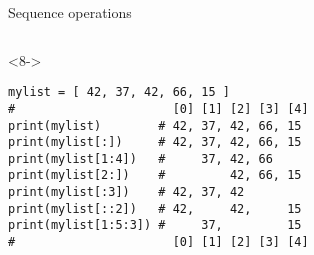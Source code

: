 \begin{frame}[fragile]{Sequence operations}
\begin{center}
\begin{columns}[onlytextwidth]
\begin{column}{\textwidth}
      \begin{onlyenv}<8->
        \begin{lstlisting}[style=python,morekeywords={for, in, range, list}]
mylist = [ 42, 37, 42, 66, 15 ]
#                      [0] [1] [2] [3] [4]
print(mylist)        # 42, 37, 42, 66, 15
print(mylist[:])     # 42, 37, 42, 66, 15
print(mylist[1:4])   #     37, 42, 66
print(mylist[2:])    #         42, 66, 15
print(mylist[:3])    # 42, 37, 42
print(mylist[::2])   # 42,     42,     15
print(mylist[1:5:3]) #     37,         15
#                      [0] [1] [2] [3] [4] \end{lstlisting}
      \end{onlyenv}

    \end{column}
  \end{columns}

  \end{center}

\end{frame}



